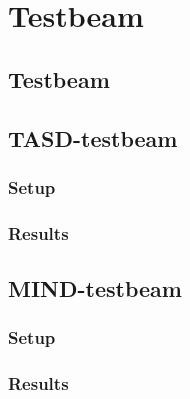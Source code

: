 \chapter{Testbeam}
\label{c:Testbeam}

\section{Testbeam}

\section{TASD-testbeam}
\subsection{Setup}
\subsection{Results}

\section{MIND-testbeam}
\subsection{Setup}
\subsection{Results}